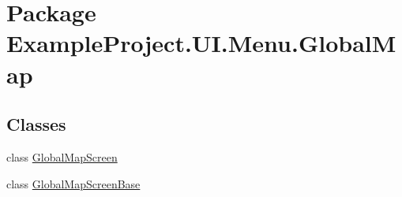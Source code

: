 \hypertarget{namespace_example_project_1_1_u_i_1_1_menu_1_1_global_map}{}\section{Package Example\+Project.\+U\+I.\+Menu.\+Global\+Map}
\label{namespace_example_project_1_1_u_i_1_1_menu_1_1_global_map}
\subsection*{Classes}
\begin{DoxyCompactItemize}
\item 
class \hyperlink{class_example_project_1_1_u_i_1_1_menu_1_1_global_map_1_1_global_map_screen}{Global\+Map\+Screen}
\item 
class \hyperlink{class_example_project_1_1_u_i_1_1_menu_1_1_global_map_1_1_global_map_screen_base}{Global\+Map\+Screen\+Base}
\end{DoxyCompactItemize}
